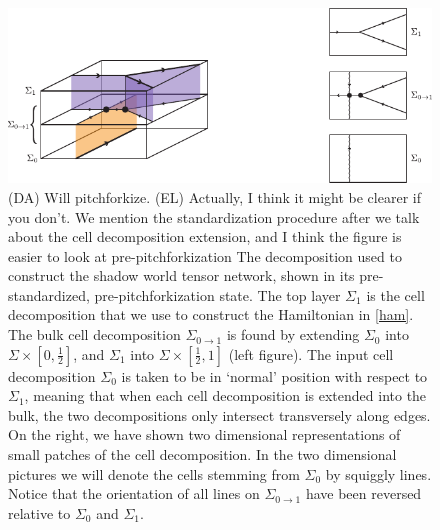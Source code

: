 \documentclass[12pt,a4paper]{article}
\newcounter{arrow}
\newcommand{\ra}{\rightarrow}
\newcommand{\dave}[1]{{\color{ao(english)}\footnotesize{(DA) #1}}}
\newcommand{\ethan}[1]{{\color{amethyst}\footnotesize{(EL) #1}}}
\begin{document}
\begin{figure}
\begin{center}
\includegraphics{CellDecomposition.pdf}
\caption{\label{CellDecomposition}
\dave{Will pitchforkize.} \ethan{Actually, I think it might be clearer if you don't. We mention the standardization procedure after we talk about the cell decomposition extension, and I think the figure is easier to look at pre-pitchforkization} 
The decomposition used to construct the shadow world tensor network, shown 
in its pre-standardized, pre-pitchforkization state.
The top layer $\Sigma_1$ is the cell decomposition that we use to construct the Hamiltonian in \eqref{ham}.
The bulk cell decomposition $\Sigma_{0\ra1}$ is found by extending $\Sigma_0$ into 
$\Sigma \times [0,\frac{1}{2}]$, and $\Sigma_{1}$ into $\Sigma \times [\frac{1}{2},1]$ (left figure).
The input cell decomposition $\Sigma_0$ is taken to be in `normal' position with respect to $\Sigma_1$, meaning that when each cell decomposition is extended into the bulk, the two decompositions only intersect transversely along edges. 
On the right, we have shown two dimensional representations of small patches of the cell decomposition. 
In the two dimensional pictures we will denote the cells stemming from $\Sigma_0$ by squiggly lines.
Notice that the orientation of all lines on $\Sigma_{0 \ra1}$ have been reversed relative to $\Sigma_0$ and $\Sigma_1$. 
}
\end{center}
\end{figure}
\end{document}
